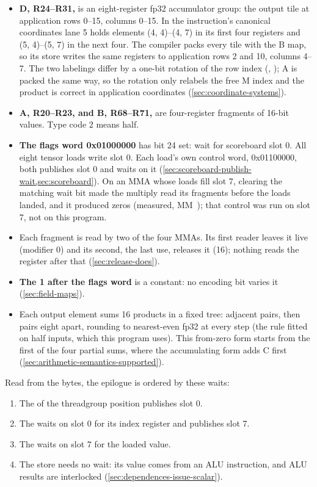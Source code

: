 \begin{itemize}
\item \textbf{D, R24–R31,} is an eight-register fp32 accumulator group: the output tile at application rows 0–15,
  columns 0–15. In the instruction's canonical coordinates lane 5 holds elements (4, 4)–(4, 7) in its first four
  registers and (5, 4)–(5, 7) in the next four. The compiler packs every tile with the B map, so its store writes the
  same registers to application rows 2 and 10, columns 4–7. The two labelings differ by a one-bit rotation of the row
  index (, ); A is packed the same way, so the rotation only relabels the free M index
  and the product is correct in application coordinates (\cref{sec:coordinate-systems}).
\item \textbf{A, R20–R23, and B, R68–R71,} are four-register fragments of 16-bit values. Type code 2 means half.
\item \textbf{The flags word 0x01000000} has bit 24 set: wait for scoreboard slot 0. All eight tensor loads write slot 0. Each
  load's own control word, 0x01100000, both publishes slot 0 and waits on it (\cref{sec:scoreboard-publish-wait,sec:scoreboard}). On an MMA
  whose loads fill slot 7, clearing the matching wait bit made the multiply read its fragments before the loads landed,
  and it produced zeros (measured, MM~); that control was run on slot 7, not on this program.
\item Each fragment is read by two of the four MMAs. Its first reader leaves it live (modifier 0)
  and its second, the last use, releases it (16); nothing reads the register after that (\cref{sec:release-does}).
\item \textbf{The 1 after the flags word} is a constant: no encoding bit varies it (\cref{sec:field-maps}).
\item Each output element sums 16 products in a fixed tree: adjacent pairs, then pairs eight apart,
  rounding to nearest-even fp32 at every step (the rule fitted on half inputs, which this program uses). This from-zero form starts from the first of the four partial sums,
  where the accumulating form adds C first (\cref{sec:arithmetic-semantics-supported}).
\end{itemize}

Read from the bytes, the epilogue is ordered by these waits:

\begin{enumerate}
\def\labelenumi{\arabic{enumi}.}
\item The  of the threadgroup position publishes slot 0.
\item The  waits on slot 0 for its index register and publishes slot 7.
\item The  waits on slot 7 for the loaded value.
\item The store needs no wait: its value comes from an ALU instruction, and ALU results are interlocked (\cref{sec:dependences-issue-scalar}).
\end{enumerate}

